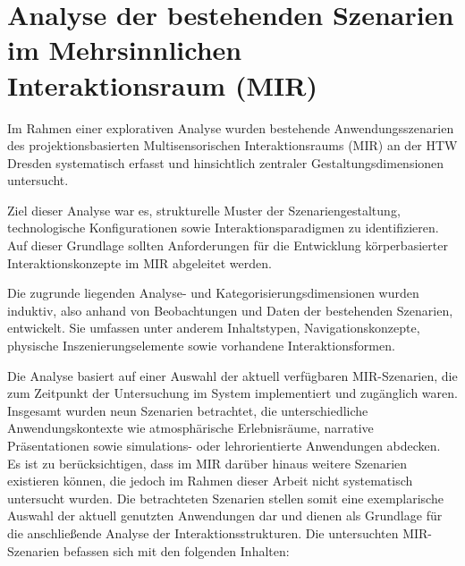 \section{Analyse der bestehenden Szenarien im Mehrsinnlichen Interaktionsraum (MIR)}
\label{sec:analyse}
Im Rahmen einer explorativen Analyse wurden bestehende Anwendungsszenarien des projektionsbasierten Multisensorischen Interaktionsraums (MIR) an der HTW Dresden systematisch erfasst und hinsichtlich zentraler Gestaltungsdimensionen untersucht.

Ziel dieser Analyse war es, strukturelle Muster der Szenariengestaltung, technologische Konfigurationen sowie Interaktionsparadigmen zu identifizieren. Auf dieser Grundlage sollten Anforderungen für die Entwicklung körper\-basierter Interaktionskonzepte im MIR abgeleitet werden.

Die zugrunde liegenden Analyse- und Kategorisierungsdimensionen wurden induktiv, also anhand von Beobachtungen und Daten der bestehenden Szenarien, entwickelt. Sie umfassen unter anderem Inhaltstypen, Navigationskonzepte, physische Inszenierungselemente sowie vorhandene Interaktionsformen.

Die Analyse basiert auf einer Auswahl der aktuell verfügbaren MIR-Szenarien, die zum Zeitpunkt der Untersuchung im System implementiert und zugänglich waren. Insgesamt wurden neun Szenarien betrachtet, die unterschiedliche Anwendungskontexte wie atmosphärische Erlebnisräume, narrative Präsentationen sowie simulations- oder lehrorientierte Anwendungen abdecken.
Es ist zu berücksichtigen, dass im MIR darüber hinaus weitere Szenarien existieren können, die jedoch im Rahmen dieser Arbeit nicht systematisch untersucht wurden. Die betrachteten Szenarien stellen somit eine exemplarische Auswahl der aktuell genutzten Anwendungen dar und dienen als Grundlage für die anschließende Analyse der Interaktionsstrukturen.
Die untersuchten MIR-Szenarien befassen sich mit den folgenden Inhalten:

